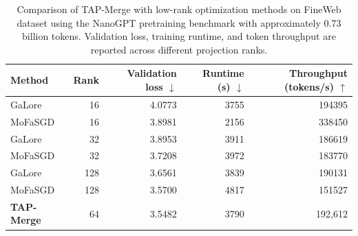 \begin{table}[t]
\centering\small
\caption{Comparison of TAP-Merge with low-rank optimization
methods on FineWeb dataset using the NanoGPT pretraining benchmark
with approximately 0.73 billion tokens. Validation loss,
training runtime, and token throughput are reported across
different projection ranks.}
\label{tab:fineweb_native}
\begin{tabular}{lrrrr}
\toprule
Method & Rank & Validation loss $\downarrow$ & Runtime (s) $\downarrow$
& Throughput (tokens/s) $\uparrow$\\
\midrule
GaLore~\cite{galore2024} & 16 & 4.0773 & 3755 & 194395\\
MoFaSGD~\cite{mofasgd2025} & 16 & 3.8981 & 2156 & 338450\\
GaLore~\cite{galore2024} & 32 & 3.8953 & 3911 & 186619\\
MoFaSGD~\cite{mofasgd2025} & 32 & 3.7208 & 3972 & 183770\\
GaLore~\cite{galore2024} & 128 & 3.6561 & 3839 & 190131\\
MoFaSGD~\cite{mofasgd2025} & 128 & 3.5700 & 4817 & 151527\\
\midrule
\textbf{TAP-Merge} & 64 & 3.5482 & 3790 & 192{,}612\\ \bottomrule
\end{tabular}
\end{table}
